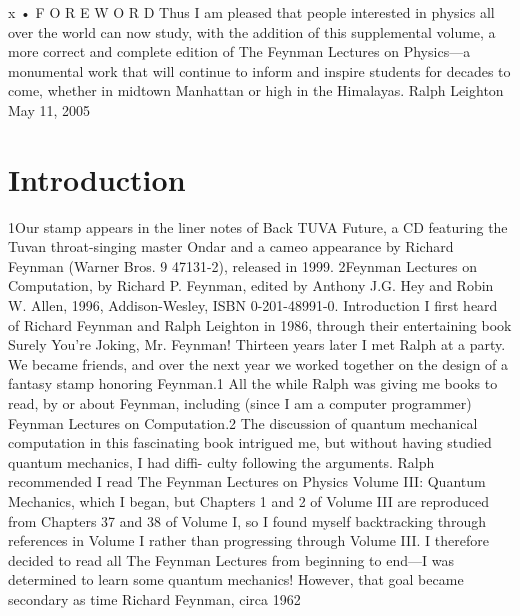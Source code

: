 \documentclass[11pt,oneside]{article}
\begin{document}
x • F O R E W O R D Thus I am pleased that people interested in physics all over the world can now study, with the addition of this supplemental volume, a more correct and complete edition of The Feynman Lectures on Physics---a monumental work that will continue to inform and inspire students for decades to come, whether in midtown Manhattan or high in the Himalayas. Ralph Leighton May 11, 2005\par



\clearpage


\section*{Introduction}



\label{tips-sec-3-introduction}


1Our stamp appears in the liner notes of Back TUVA Future, a CD featuring the Tuvan throat-singing master Ondar and a cameo appearance by Richard Feynman (Warner Bros. 9 47131-2), released in 1999. 2Feynman Lectures on Computation, by Richard P. Feynman, edited by Anthony J.G. Hey and Robin W. Allen, 1996, Addison-Wesley, ISBN 0-201-48991-0. Introduction I first heard of Richard Feynman and Ralph Leighton in 1986, through their entertaining book Surely You’re Joking, Mr. Feynman! Thirteen years later I met Ralph at a party. We became friends, and over the next year we worked together on the design of a fantasy stamp honoring Feynman.1 All the while Ralph was giving me books to read, by or about Feynman, including (since I am a computer programmer) Feynman Lectures on Computation.2 The discussion of quantum mechanical computation in this fascinating book intrigued me, but without having studied quantum mechanics, I had diffi- culty following the arguments. Ralph recommended I read The Feynman Lectures on Physics Volume III: Quantum Mechanics, which I began, but Chapters 1 and 2 of Volume III are reproduced from Chapters 37 and 38 of Volume I, so I found myself backtracking through references in Volume I rather than progressing through Volume III. I therefore decided to read all The Feynman Lectures from beginning to end---I was determined to learn some quantum mechanics! However, that goal became secondary as time Richard Feynman, circa 1962\par
\end{document}
